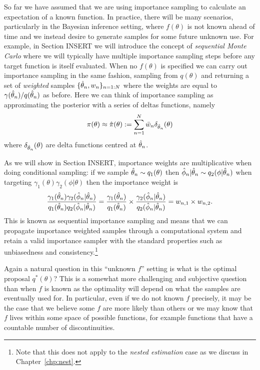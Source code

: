 So far we have assumed that we are using importance sampling to calculate an expectation 
of a known function.  In practice, there will be many scenarios, particularly in the Bayesian inference setting,
where $f(\theta)$ is not known ahead of time and we instead desire to generate samples
for some future unknown use.  For example, in Section INSERT we will introduce the concept
of \emph{sequential Monte Carlo} where we will typically have multiple importance sampling steps
before any target function is itself evaluated.
When no $f(\theta)$ is specified we can carry out importance sampling in the
same fashion, sampling from $q (\theta)$ and returning a set of \emph{weighted} samples
$\{\hat{\theta}_n,w_n\}_{n=1:N}$ where the weights are equal to $\gamma(\hat{\theta}_n) / q(\hat{\theta}_n)$ as before.
Here we can think of importance sampling as approximating the posterior with a series of deltas
functions, namely
\begin{align}
\label{eq:inf:imp-post-est}
\pi (\theta) \approx \hat{\pi}(\theta) := \sum_{n=1}^{N} \bar{w}_n \delta_{\hat{\theta}_n} (\theta)
\end{align}
where $\delta_{\hat{\theta}_n} (\theta)$ are delta functions centred at $\hat{\theta}_n$.

As we will show in Section INSERT, importance weights are multiplicative when doing conditional
sampling: if we sample $\hat{\theta}_n \sim q_1(\theta)$ then $\hat{\phi}_n | \hat{\theta}_n \sim q_2(\phi | \hat{\theta}_n)$
when targeting $\gamma_1(\theta)\gamma_2(\phi|\theta)$ then the importance weight is 
\begin{align}
\label{eq:inf:prod-imp-weights}
\frac{\gamma_1(\hat{\theta}_n)\gamma_2(\hat{\phi}_n|\hat{\theta}_n)}{q_1(\hat{\theta}_n)q_2(\hat{\phi}_n | \hat{\theta}_n)}
=\frac{\gamma_1(\hat{\theta}_n)}{q_1(\hat{\theta}_n)}
\times\frac{\gamma_2(\hat{\phi}_n|\hat{\theta}_n)} {q_2(\hat{\phi}_n | \hat{\theta}_n)}= w_{n,1} \times w_{n,2}.
\end{align}
This is known as sequential importance sampling and means that we can propagate importance
weighted samples through a computational system and retain a valid importance
sampler with the standard properties such as unbiasedness and consistency.\footnote{Note that
	this does not apply to the \emph{nested estimation} case as we discuss in
	Chapter~\ref{chp:nest}.} 

Again a natural question in this ``unknown $f$'' setting is what is the optimal proposal $q^*(\theta)$?
This is a somewhat more challenging and subjective question than when $f$ is known as the
optimality will depend on what the samples are eventually used for.  In particular, even if we do
not known $f$ precisely, it may be the case that we believe some $f$ are more likely than others or we
may know that $f$ lives within some space of possible functions, for example functions that have
a countable number of discontinuities.  

